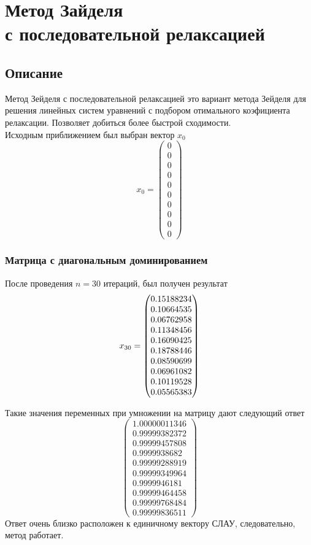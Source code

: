 \documentclass[../../report.tex]{subfiles}
\begin{document}
\chapter[Метод Зайделя с последовательной релаксацией]{\texorpdfstring{Метод Зайделя \\ 
с последовательной релаксацией}{Метод Зайделя с последовательной релаксацией}}

\section{Описание}
Метод Зейделя с последовательной релаксацией это вариант метода Зейделя для решения линейных систем уравнений с подбором отимального коэфициента релаксации. Позволяет добиться  более быстрой сходимости. \\
Исходным приближением был выбран вектор $x_0$ 
\[
x_0 = \begin{pmatrix}
    0 \\ 
    0 \\ 
    0 \\ 
    0 \\ 
    0 \\ 
    0 \\ 
    0 \\ 
    0 \\ 
    0 \\ 
    0 
\end{pmatrix}
\]

\subsection{Матрица с диагональным доминированием}
После проведения $n=30$ итераций, был получен результат
\[
x_{30} = \begin{pmatrix} 0.15188234 \\ 0.10664535 \\ 0.06762958 \\ 0.11348456 \\ 0.16090425 \\ 0.18788446 \\ 0.08590699 \\ 0.06961082 \\ 0.10119528 \\ 0.05565383 \end{pmatrix}
\]

Такие значения переменных при умножении на матрицу дают следующий ответ
\[
\begin{pmatrix}
    1.00000011346 \\
    0.99999382372 \\
    0.99999457808 \\
    0.9999938682 \\
    0.99999288919 \\
    0.99999349964 \\
    0.9999946181 \\
    0.99999464458 \\
    0.99999768484 \\
    0.99999836511
\end{pmatrix}
\]
Ответ очень близко расположен к единичному вектору СЛАУ, следовательно, метод работает.
\end{document}
